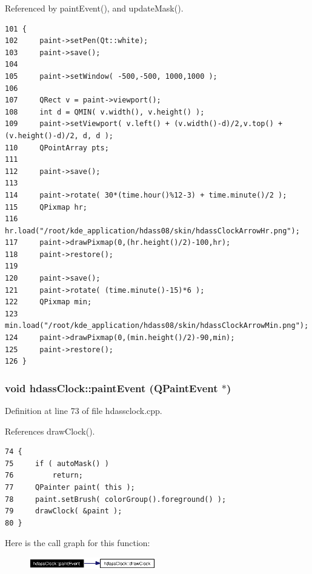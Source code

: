 Referenced by paint\-Event(), and update\-Mask().



\footnotesize\begin{verbatim}101 {
102     paint->setPen(Qt::white);
103     paint->save();
104     
105     paint->setWindow( -500,-500, 1000,1000 );
106 
107     QRect v = paint->viewport();
108     int d = QMIN( v.width(), v.height() );
109     paint->setViewport( v.left() + (v.width()-d)/2,v.top() + (v.height()-d)/2, d, d );
110     QPointArray pts;
111 
112     paint->save();
113     
114     paint->rotate( 30*(time.hour()%12-3) + time.minute()/2 ); 
115     QPixmap hr;
116     hr.load("/root/kde_application/hdass08/skin/hdassClockArrowHr.png"); 
117     paint->drawPixmap(0,(hr.height()/2)-100,hr);
118     paint->restore();
119 
120     paint->save();
121     paint->rotate( (time.minute()-15)*6 );
122     QPixmap min;
123     min.load("/root/kde_application/hdass08/skin/hdassClockArrowMin.png");
124     paint->drawPixmap(0,(min.height()/2)-90,min);
125     paint->restore();
126 }
\end{verbatim}\normalsize 
{}
\subsubsection{\setlength{\rightskip}{0pt plus 5cm}void hdass\-Clock::paint\-Event (QPaint\-Event $\ast$)\hspace{0.3cm}{\tt  [protected]}}\label{classhdassClock_hdassClockb1}




Definition at line 73 of file hdassclock.cpp.

References draw\-Clock().



\footnotesize\begin{verbatim}74 {
75     if ( autoMask() )
76         return;
77     QPainter paint( this );
78     paint.setBrush( colorGroup().foreground() );
79     drawClock( &paint );
80 }
\end{verbatim}\normalsize 


Here is the call graph for this function:\begin{figure}[H]
\begin{center}
\leavevmode
\includegraphics[width=157pt]{classhdassClock_hdassClockb1_cgraph}
\end{center}
\end{figure}
